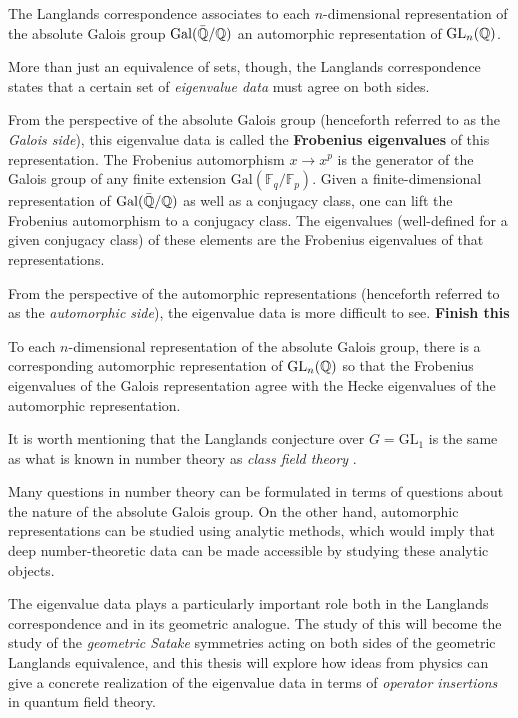 \begin{idea}
	The Langlands correspondence associates to each $n$-dimensional representation of the absolute Galois group $\mathrm{Gal}(\bar {\mathbb{Q}}/\mathbb{Q})$ an automorphic representation of $\mathrm{GL}_n(\mathbb{Q})$.
\end{idea}
More than just an equivalence of sets, though, the Langlands correspondence states that a certain set of \emph{eigenvalue data} must agree on both sides. 

From the perspective of the absolute Galois group (henceforth referred to as the \emph{Galois side}), this eigenvalue data is called the \textbf{Frobenius eigenvalues} of this representation. The Frobenius automorphism $x \to x^p$ is the generator of the Galois group of any finite extension $\mathrm{Gal}(\mathbb F_q/\mathbb F_p)$. Given a finite-dimensional representation of $\mathrm{Gal}(\bar {\mathbb{Q}}/\mathbb{Q})$ as well as a conjugacy class, one can lift the Frobenius automorphism to a conjugacy class. The eigenvalues (well-defined for a given conjugacy class) of these elements are the Frobenius eigenvalues of that representations. 

From the perspective of the automorphic representations (henceforth referred to as the \emph{automorphic side}), the eigenvalue data is more difficult to see. 
\textbf{Finish this}


\begin{conj}[Langlands]
	To each $n$-dimensional representation of the absolute Galois group, there is a corresponding automorphic representation of $\mathrm{GL}_n(\mathbb{Q})$ so that the Frobenius eigenvalues of the Galois representation agree with the Hecke eigenvalues of the automorphic representation.
\end{conj}

It is worth mentioning that the Langlands conjecture over $G = \mathrm{GL}_1$ is the same as what is known in number theory as \emph{class field theory} \cite{Yoo18}. 


Many questions in number theory can be formulated in terms of questions about the nature of the absolute Galois group. On the other hand, automorphic representations can be studied using analytic methods, which would imply that deep number-theoretic data can be made accessible by studying these analytic objects.

The eigenvalue data plays a particularly important role both in the Langlands correspondence and in its geometric analogue. The study of this will become the study of the \emph{geometric Satake} symmetries acting on both sides of the geometric Langlands equivalence, and this thesis will explore how ideas from physics can give a concrete realization of the eigenvalue data in terms of \emph{operator insertions} in quantum field theory. 

